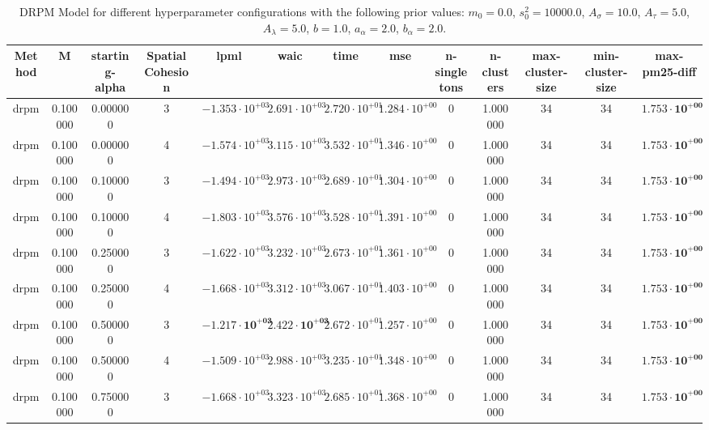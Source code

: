 \begin{table}
\caption{DRPM Model for different hyperparameter configurations with the following prior values:  
    $m_0 = 0.0$, $s_0^2 = 10000.0$, $A_\sigma = 10.0$, $A_\tau = 5.0$, $A_\lambda = 5.0$, $b = 1.0$, $a_\alpha = 2.0$, $b_\alpha = 2.0$.
}
\centering
\begin{tabular}{ccccccccccccc}
\toprule
Method & M & starting-alpha & SpatialCohesion & lpml & waic & time & mse & n-singletons & n-clusters & max-cluster-size & min-cluster-size & max-pm25-diff \\
\midrule
drpm & 0.100000 & 0.000000 & 3 & $-1.353 \cdot 10^{+03}$ & $2.691 \cdot 10^{+03}$ & $2.720 \cdot 10^{+01}$ & $1.284 \cdot 10^{+00}$ & 0 & 1.000000 & 34 & 34 & $\mathbf{1.753 \cdot 10^{+00}}$ \\
drpm & 0.100000 & 0.000000 & 4 & $-1.574 \cdot 10^{+03}$ & $3.115 \cdot 10^{+03}$ & $3.532 \cdot 10^{+01}$ & $1.346 \cdot 10^{+00}$ & 0 & 1.000000 & 34 & 34 & $\mathbf{1.753 \cdot 10^{+00}}$ \\
drpm & 0.100000 & 0.100000 & 3 & $-1.494 \cdot 10^{+03}$ & $2.973 \cdot 10^{+03}$ & $2.689 \cdot 10^{+01}$ & $1.304 \cdot 10^{+00}$ & 0 & 1.000000 & 34 & 34 & $\mathbf{1.753 \cdot 10^{+00}}$ \\
drpm & 0.100000 & 0.100000 & 4 & $-1.803 \cdot 10^{+03}$ & $3.576 \cdot 10^{+03}$ & $3.528 \cdot 10^{+01}$ & $1.391 \cdot 10^{+00}$ & 0 & 1.000000 & 34 & 34 & $\mathbf{1.753 \cdot 10^{+00}}$ \\
drpm & 0.100000 & 0.250000 & 3 & $-1.622 \cdot 10^{+03}$ & $3.232 \cdot 10^{+03}$ & $2.673 \cdot 10^{+01}$ & $1.361 \cdot 10^{+00}$ & 0 & 1.000000 & 34 & 34 & $\mathbf{1.753 \cdot 10^{+00}}$ \\
drpm & 0.100000 & 0.250000 & 4 & $-1.668 \cdot 10^{+03}$ & $3.312 \cdot 10^{+03}$ & $3.067 \cdot 10^{+01}$ & $1.403 \cdot 10^{+00}$ & 0 & 1.000000 & 34 & 34 & $\mathbf{1.753 \cdot 10^{+00}}$ \\
drpm & 0.100000 & 0.500000 & 3 & $\mathbf{-1.217 \cdot 10^{+03}}$ & $\mathbf{2.422 \cdot 10^{+03}}$ & $2.672 \cdot 10^{+01}$ & $1.257 \cdot 10^{+00}$ & 0 & 1.000000 & 34 & 34 & $\mathbf{1.753 \cdot 10^{+00}}$ \\
drpm & 0.100000 & 0.500000 & 4 & $-1.509 \cdot 10^{+03}$ & $2.988 \cdot 10^{+03}$ & $3.235 \cdot 10^{+01}$ & $1.348 \cdot 10^{+00}$ & 0 & 1.000000 & 34 & 34 & $\mathbf{1.753 \cdot 10^{+00}}$ \\
drpm & 0.100000 & 0.750000 & 3 & $-1.668 \cdot 10^{+03}$ & $3.323 \cdot 10^{+03}$ & $2.685 \cdot 10^{+01}$ & $1.368 \cdot 10^{+00}$ & 0 & 1.000000 & 34 & 34 & $\mathbf{1.753 \cdot 10^{+00}}$ \\

\end{tabular}
\end{table}

